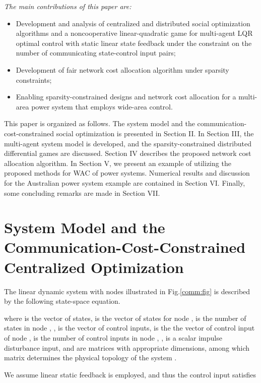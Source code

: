 \documentclass[12pt, draftclsnofoot,onecolumn]{IEEEtran}
\begin{document}
{\it The main contributions of this paper are:}
\begin{itemize}
\item Development and analysis of centralized and distributed social optimization algorithms and a noncooperative linear-quadratic game for multi-agent LQR optimal control with static linear state feedback under the constraint on the number of communicating state-control input pairs;
\item Development of fair network cost allocation algorithm under sparsity constraints;
\item Enabling sparsity-constrained designs and network cost allocation for a multi-area power system that employs wide-area control.
\end{itemize}


This paper is organized as follows. The system model and the communication-cost-constrained social optimization is presented in Section II. In Section III, the multi-agent system model is developed, and the sparsity-constrained distributed differential games are discussed. Section IV describes the proposed network cost allocation algorithm. In Section V, we present an example of utilizing the proposed methods for WAC of power systems. Numerical results and discussion for the Australian power system example are contained in Section VI. Finally, some concluding remarks are made in Section VII.  




\section{System Model and the Communication-Cost-Constrained Centralized Optimization}
\label{cent_sparse:sec}

The linear dynamic system with  nodes illustrated in Fig.\ref{comm:fig} is described by the following state-space equation. 

\noindent where  is the vector of states,  is the vector of states for node ,  is the number of states in node , ,  is the vector of control inputs,  is the the vector of control input of node ,  is the number of control inputs in node , ,  is a scalar impulse disturbance input, and  are matrices with appropriate dimensions, among which matrix  determines the physical topology of the system \cite{lewis1995optimal}.




We assume linear static feedback is employed, and thus the control input satisfies
\end{document}
